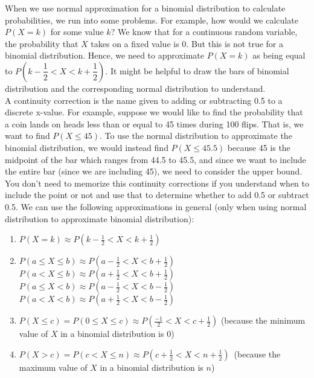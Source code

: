 When we use normal approximation for a binomial distribution to calculate probabilities, we run into some problems. For example, how would we calculate $P(X = k)$ for some value $k$? We know that for a continuous random variable, the probability that $X$ takes on a fixed value is 0. But this is not true for a binomial distribution. Hence, we need to approximate $P(X = k)$ as being equal to $P(k - \dfrac{1}{2} < X < k + \dfrac{1}{2})$. It might be helpful to draw the bars of binomial distribution and the corresponding normal distribution to understand. \\ 
A continuity correction is the name given to adding or subtracting 0.5 to a discrete x-value.
For example, suppose we would like to find the probability that a coin lands on heads less than or equal to 45 times during 100 flips. That is, we want to find $P(X \leq 45)$. To use the normal distribution to approximate the binomial distribution, we would instead find $P(X \leq 45.5)$ because 45 is the midpoint of the bar which ranges from 44.5 to 45.5, and since we want to include the entire bar (since we are including 45), we need to consider the upper bound.
You don't need to memorize this continuity corrections if you understand when to include the point or not and use that to determine whether to add 0.5 or subtract 0.5.
We can use the following approximations in general (only when using normal distribution to approximate binomial distribution):
\begin{enumerate}
    \item $P(X = k) \approx P(k - \frac{1}{2} < X < k + \frac{1}{2})$
    \item $P(a \leq X \leq b) \approx P(a - \frac{1}{2} < X < b + \frac{1}{2})$ \\
    $P(a < X \leq b) \approx P(a + \frac{1}{2} < X < b + \frac{1}{2})$ \\
    $P(a \leq X < b) \approx P(a - \frac{1}{2} < X < b - \frac{1}{2})$ \\
    $P(a < X < b) \approx P(a + \frac{1}{2} < X < b - \frac{1}{2})$
    \item $P(X \leq c) = P(0 \leq X \leq c) \approx P(\frac{-1}{2} < X < c + \frac{1}{2})$ (because the minimum value of  $X$ in a binomial distribution is 0)
    \item $P(X > c) = P(c < X \leq n) \approx P(c + \frac{1}{2} < X < n + \frac{1}{2})$\ (because the maximum value of $X$ in a binomial distribution is $n$)
\end{enumerate}
%